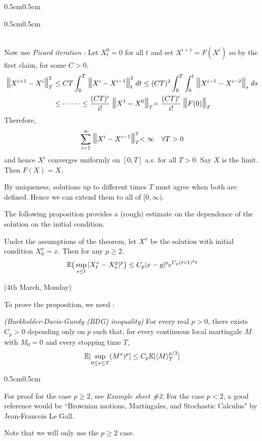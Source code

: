 \documentclass[12pt,a4paper]{article}
\newenvironment{proof}
{\begin{changemargin}{0.5cm}{0.5cm} 
	}%
	{\end{changemargin}
}
\newenvironment{subproof}
{\begin{changemargin}{0.5cm}{0.5cm} 
	}%
	{\end{changemargin}
}
\newenvironment{p}
{\begin{proof} 
	}%
	{\end{proof}
}
\begin{document}
\begin{p}
\begin{subproof}
\begin{align*}
\end{align*}
\end{subproof}
Now use \emph{Picard iteration} : Let $X_t^0 = 0$ for all $t$ and set $X^{i+1} = F(X^i)$ so by the first claim, for some $C>0$,
\begin{align*}
\tnorms{X^{i+1} - X^i}{T}^2 &\leq CT \int_0^T \tnorms{X^{i} - X^{i-1}}{t}^2 dt \leq (CT)^2 \int_0^T \int_0^t \tnorms{X^{i-1} - X^{i-2}}{s} ds \\
&\leq \cdots\cdots \leq \frac{(CT)^i}{i!} \tnorms{X^1 - X^0}{T} = \frac{(CT)^i}{i!} \tnorms{F(0)}{T} 
\end{align*}
Therefore,
\begin{align*}
\sum_{i=1}^{\infty} \tnorms{X^i - X^{i-1}}{T}^2 < \infty \quad \forall T>0
\end{align*}
and hence $X^i$ converges uniformly on $[0, T]$ a.s. for all $T>0$. Say $X$ is the limit. Then $F(X)=X$.
\s

By uniqueness, solutions up to different times $T$ must agree when both are defined. Hence we can extend them to all of $[0, \infty)$. 

\eop
\end{p}
\s

The following proposition provides a (rough) estimate on the dependence of the solution on the initial condition.
\s

\prop Under the assumptions of the theorem, let $X^{x}$ be the solution with initial condition $X_0^x =x$. Then for any $p\geq 2$,
\begin{align*}
\mathbb{E} \big( \sup_{s\leq t} |X_t^x - X_s^y|^p \big) \leq C_p |x-y|^p e^{C_p (t\vee 1)^p t}
\end{align*}

\newday

(4th March, Monday)
\s

To prove the proposition, we need :
\s

\lem \emph{(Burkholder-Davis-Gundy (BDG) inequality)} For every real $p>0$, there exists $C_p>0$ depending only on $p$ such that, for every continuous local martingale $M$ with $M_0 =0$ and every stopping time $T$,
\begin{align*}
\mathbb{E} [\sup_{0\leq s\leq T}(M^s)^p] \leq C_p \mathbb{E} [ \langle M \rangle_T^{p/2}]
\end{align*}
\begin{p}
For proof for the case $p\geq 2$, see \emph{Example sheet \#2}. For the case $p< 2$, a good reference would be ``Brownian motions, Martingales, and Stochastic Calculus" by Jean-Francois Le Gall.

\quad Note that we will only use the $p\geq 2$ case.
\end{p}
\s
\end{document}
